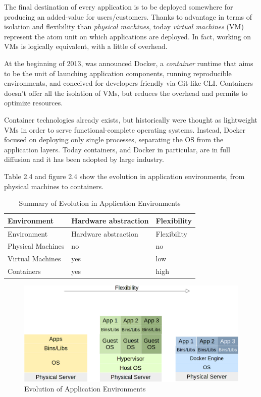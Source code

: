 The final destination of every application is to be deployed somewhere
for producing an added-value for users/customers. Thanks to advantage in
terms of isolation and flexibility than \textit{physical machines}, today
\textit{virtual machines} (VM) represent the atom unit on which
applications are deployed. In fact, working on VMs is logically
equivalent, with a little of overhead.

At the beginning of 2013, was announced Docker, a \textit{container}
runtime\cite{Docker: Lightweight Linux Containers for Consistent Development and Deployment} that aims to be the unit
of launching application components, running reproducible environments,
and conceived for developers friendly via Git-like CLI. Containers
doesn't offer all the isolation of VMs, but reduces the overhead and
permits to optimize resources.

Container technologies already exists, but historically were thought as
lightweight VMs in order to serve functional-complete operating systems.
Instead, Docker focused on deploying only single processes, separating
the OS from the application layers. Today containers, and Docker in
particular, are in full diffusion and it has been adopted by large
industry.

Table 2.4 and figure 2.4 show the evolution in application environments, from physical machines to containers.

\begin{longtable}[c]{@{}lll@{}}
\caption{Summary of Evolution in Application
Environments}\tabularnewline
\toprule
Environment & Hardware abstraction & Flexibility\tabularnewline
\midrule
\endfirsthead
\toprule
Environment & Hardware abstraction & Flexibility\tabularnewline
\midrule
\endhead
Physical Machines & no & no\tabularnewline
Virtual Machines & yes & low\tabularnewline
Containers & yes & high\tabularnewline
\bottomrule
\end{longtable}

\begin{figure}[htbp]
\centering
\includegraphics{media/ch2-containers.png}
\caption{Evolution of Application Environments}
\end{figure}

